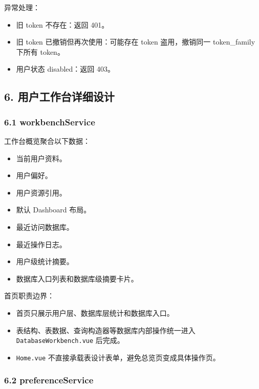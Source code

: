 \documentclass[
  a4paper,
  UTF8]{ctexart}
\providecommand{\tightlist}{%
  \setlength{\itemsep}{0pt}\setlength{\parskip}{0pt}}
\begin{document}
异常处理：

\begin{itemize}
\tightlist
\item
  旧 token 不存在：返回 401。
\item
  旧 token 已撤销但再次使用：可能存在 token 盗用，撤销同一 token\_family
  下所有 token。
\item
  用户状态 disabled：返回 403。
\end{itemize}

\hypertarget{ux7528ux6237ux5de5ux4f5cux53f0ux8be6ux7ec6ux8bbeux8ba1}{%
\subsection{6.
用户工作台详细设计}\label{ux7528ux6237ux5de5ux4f5cux53f0ux8be6ux7ec6ux8bbeux8ba1}}

\hypertarget{workbenchservice}{%
\subsubsection{6.1 workbenchService}\label{workbenchservice}}

工作台概览聚合以下数据：

\begin{itemize}
\tightlist
\item
  当前用户资料。
\item
  用户偏好。
\item
  用户资源引用。
\item
  默认 Dashboard 布局。
\item
  最近访问数据库。
\item
  最近操作日志。
\item
  用户级统计摘要。
\item
  数据库入口列表和数据库级摘要卡片。
\end{itemize}

首页职责边界：

\begin{itemize}
\tightlist
\item
  首页只展示用户层、数据库层统计和数据库入口。
\item
  表结构、表数据、查询构造器等数据库内部操作统一进入
  \texttt{DatabaseWorkbench.vue} 后完成。
\item
  \texttt{Home.vue} 不直接承载表设计表单，避免总览页变成具体操作页。
\end{itemize}

\hypertarget{preferenceservice}{%
\subsubsection{6.2 preferenceService}\label{preferenceservice}}
\end{document}
